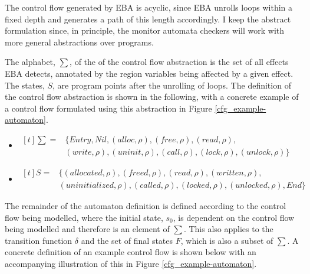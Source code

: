 \newpar The control flow generated by EBA is acyclic, since EBA unrolls loops within a fixed depth and generates a path of this length accordingly. I keep the abstract formulation since, in principle, the monitor automata checkers will work with more general abstractions over programs.

\newpar The alphabet, $\sum$, of the of the control flow abstraction is the set of all effects EBA detects, annotated by the region variables being affected by a given effect. The states, $S$, are program points after the unrolling of loops. The definition of the control flow abstraction is shown in the following, with a concrete example of a control flow formulated using this abstraction in Figure \ref{cfg_example-automaton}. 

\begin{itemize}
    \item{
        $
            \begin{aligned}[t] 
                \sum = & \{\mathit{Entry}, \mathit{Nil}, (alloc, \rho), (free, \rho), (read, \rho), \\ & (write, \rho), (uninit, \rho), (call, \rho), (lock, \rho), (unlock, \rho)\}
            \end{aligned} 
        $
    }
    \item{
        $
            \begin{aligned}[t]
                S = & \{(allocated, \rho), (freed, \rho), (read, \rho), (written, \rho),\\ & (uninitialized, \rho), (called, \rho), (locked, \rho), (unlocked, \rho), End\}
            \end{aligned}
        $
    }
\end{itemize}

\noindent The remainder of the automaton definition is defined according to the control flow being modelled, where the initial state, $s_0$, is dependent on the control flow being modelled and therefore is an element of $\sum$. This also applies to the transition function $\delta$ and the set of final states $F$, which is also a subset of $\sum$. A concrete definition of an example control flow is shown below with an accompanying illustration of this in Figure \ref{cfg_example-automaton}.

